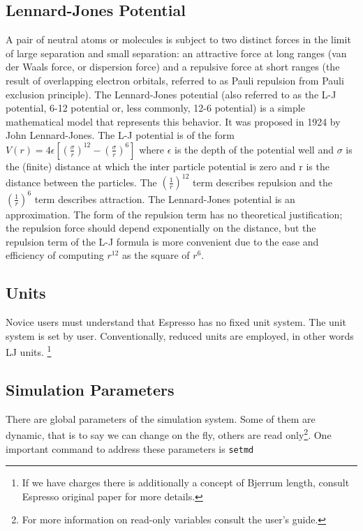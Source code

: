 \documentclass[
paper=a4,                       %
fontsize=11pt,                  %
twoside,                        %
footsepline,                    %
headsepline,                    %
headinclude=false,              %
footinclude=false,              %
pagesize,                       %
]{scrartcl}
\begin{document}
\subsection{Lennard-Jones Potential}
A pair of neutral atoms or molecules is subject to two distinct forces in the limit
of large separation and small separation: an attractive force at long ranges (van der
Waals force, or dispersion force) and a repulsive force at short ranges (the result
of overlapping electron orbitals, referred to as Pauli repulsion from Pauli exclusion
principle). The Lennard-Jones potential (also referred to as the L-J potential, 6-12
potential or, less commonly, 12-6 potential) is a simple mathematical model that
represents this behavior. It was proposed in 1924 by John Lennard-Jones. The L-J
potential is of the form
\begin{math}
\label{eq:lj}
    V(r) = 4\epsilon [{({\frac{\sigma}{r}})}^{12} - (\frac{\sigma}{r})^{6}]
\end{math}
where $\epsilon$ is the depth of the potential well and $\sigma$ is the (finite)
distance at which the inter particle potential is zero and r is the distance between
the particles. The $(\frac{1}{r})^{12}$ term describes repulsion and the
$(\frac{1}{r})^{6}$  term describes attraction. The Lennard-Jones potential is an
approximation. The form of the repulsion term has no theoretical justification; the
repulsion force should depend exponentially on the distance, but the repulsion term
of the L-J formula is more convenient due to the ease and efficiency of computing
$r^{12}$ as the square of $r^6$.

 \subsection{Units}
  Novice users must understand that Espresso has no fixed unit system. The unit 
  system is set by user. Conventionally, reduced units are employed, in other 
  words LJ units.
  \footnote{If we have charges there is additionally a concept of Bjerrum length, consult Espresso original paper for more details.} 

 \subsection{Simulation Parameters}
  There are global parameters of the simulation system. Some of them are
  dynamic, that is to say we can change on the fly, others are read only\footnote{For
  more information on read-only variables consult the user's guide.}. One
  important \es{} command to address these parameters is \lstinline|setmd|
  
\end{document}

